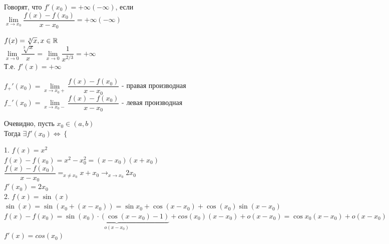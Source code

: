 \begin{definition}
	Говорят, что $ f'(x_0) = +\infty (-\infty) $, если \\
	$ \lim\limits_{x \rightarrow x_0} \dfrac{f(x) - f(x_0)}{x - x_0} =  +\infty (-\infty) $
\end{definition}

\begin{example}
	$ f(x) = \sqrt[3]{x}, x \in \mathbb{R} $ \\
	$ \lim\limits_{x \rightarrow 0} \dfrac{\sqrt[3]{x}}{x} =  \lim\limits_{x \rightarrow 0} \dfrac{1}{x^{2/3}} = +\infty $ \\
	Т.е. $ f'(x) = +\infty $ 
\end{example}

\begin{definition}
	$ f_+' (x_0) = \lim\limits_{x \rightarrow x_0+} \dfrac{f(x) - f(x_0)}{x - x_0} $ - правая производная \\
	$ f_-' (x_0) = \lim\limits_{x \rightarrow x_0-} \dfrac{f(x) - f(x_0)}{x - x_0} $ - левая производная \\
\end{definition}

Очевидно, пусть $ x_0 \in (a, b) $ \\ %
Тогда  $ \exists f'(x_0) \Leftrightarrow \left\{ \begin{array}{ll}
	
\end{array} \right. $
\begin{example}
	1. $ f(x) = x^2 $ \\
	$ f(x) - f(x_0) = x^2 - x_0^2 = (x-x_0)(x+x_0) $ \\
	$  \dfrac{f(x) - f(x_0)}{x - x_0} =_{x \neq x_0} x + x_0 \rightarrow_{x \rightarrow x_0} 2x_0  $\\
	$ f'(x_0) = 2x_0 $ \\
	2. $ f(x) = \sin(x) $ \\
	$ \sin(x) = \sin(x_0 + (x - x_0))  = \sin x_0 + \cos(x - x_0) + \cos(x_0) \sin(x-x_0) $ \\
	$ f(x) - f(x_0) = \underbrace{\sin(x_0) \cdot (\cos(x-x_0) - 1)}_{o(x-x_0)} + cos(x_0) (x- x_0) + o(x-x_0)  = \cos x_0 (x - x_0) + o(x - x_0) $ \\
	$ f'(x) = cos(x_0) $ 
\end{example}

